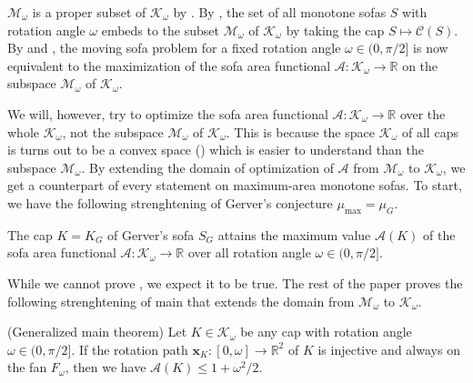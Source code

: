\(\mathcal{M}_\omega\) is a proper subset of \(\mathcal{K}_\omega\) by . By , the set of all monotone sofas \(S\) with rotation angle \(\omega\) embeds to the subset \(\mathcal{M}_\omega\) of \(\mathcal{K}_\omega\) by taking the cap \(S \mapsto \mathcal{C}(S)\). By  and , the moving sofa problem for a fixed rotation angle \(\omega \in (0, \pi/2]\) is now equivalent to the maximization of the sofa area functional \(\mathcal{A} : \mathcal{K}_\omega \to \mathbb{R}\) on the subspace \(\mathcal{M}_\omega\) of \(\mathcal{K}_\omega\).

We will, however, try to optimize the sofa area functional \(\mathcal{A} : \mathcal{K}_\omega \to \mathbb{R}\) over the whole \(\mathcal{K}_\omega\), not the subspace \(\mathcal{M}_\omega\) of \(\mathcal{K}_\omega\). This is because the space \(\mathcal{K}_\omega\) of all caps is turns out to be a convex space () which is easier to understand than the subspace \(\mathcal{M}_\omega\). By extending the domain of optimization of \(\mathcal{A}\) from \(\mathcal{M}_\omega\) to \(\mathcal{K}_\omega\), we get a counterpart of every statement on maximum-area monotone sofas. To start, we have the following strenghtening of Gerver’s conjecture \(\mu_{\max} = \mu_G\).

\begin{conjecture}

The cap \(K = K_G\) of Gerver’s sofa \(S_G\) attains the maximum value \(\mathcal{A}(K)\) of the sofa area functional \(\mathcal{A} : \mathcal{K}_\omega \to \mathbb{R}\) over all rotation angle \(\omega \in (0, \pi/2]\).

\label{con:gerver-cap}
\end{conjecture}

While we cannot prove , we expect it to be true. The rest of the paper proves the following strenghtening of main  that extends the domain from \(\mathcal{M}_\omega\) to \(\mathcal{K}_\omega\).

\begin{theorem}

(Generalized main theorem) Let \(K \in \mathcal{K}_\omega\) be any cap with rotation angle \(\omega \in (0, \pi/2]\). If the rotation path \(\mathbf{x}_K : [0, \omega] \to \mathbb{R}^2\) of \(K\) is injective and always on the fan \(F_\omega\), then we have \(\mathcal{A}(K) \leq 1 + \omega^2/2\).

\label{thm:main-cap}
\end{theorem}

